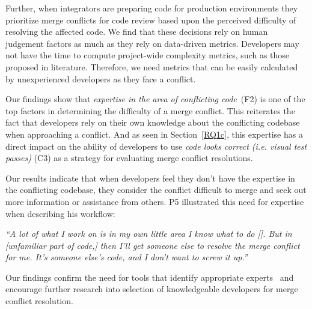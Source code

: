 Further, when integrators are preparing code for production environments they prioritize merge conflicts for code review based upon the perceived difficulty of resolving the affected code.
We find that these decisions rely on human judgement factors as much as they rely on data-driven metrics.
Developers may not have the time to compute project-wide complexity metrics, such as those proposed in  literature.
Therefore, we need metrics that can be easily calculated by unexperienced developers as they face a conflict. 

\label{knowledge-based-factors}
Our findings show that \textit{expertise in the area of conflicting code}~(F2) is one of the top factors in determining the difficulty of a merge conflict. 
This reiterates the fact that developers rely on their own knowledge about the conflicting codebase when approaching a conflict. 
And as seen in Section~\ref{RQ1c}, this expertise has a direct impact on the ability of developers to use \textit{code looks correct (i.e. visual test passes)} (C3) as a strategy for evaluating merge conflict resolutions.

Our results indicate that when developers feel they don't have the expertise in the conflicting codebase, they consider the conflict difficult to merge and seek out more information or assistance from others.
P5 illustrated this need for expertise when describing his workflow: 
\begin{quoting}
	\textit{``A lot of what I work on is in my own little area \textellipsis I know what to do [\textellipsis]. But in [unfamiliar part of code,] then I'll get someone else to resolve the merge conflict for me. It's someone else's code, and I don't want to screw it up.''}
\end{quoting}

Our findings confirm the need for tools that identify appropriate experts~\cite{CostaSarma} and encourage further research into selection of knowledgeable developers for merge conflict resolution.


